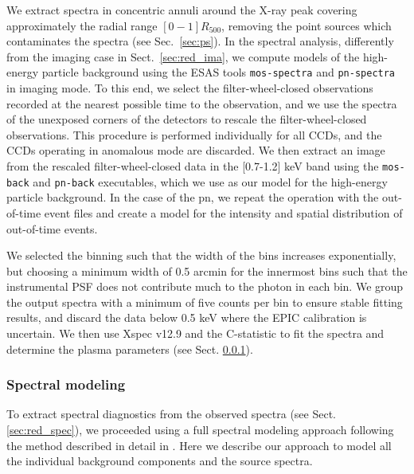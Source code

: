 \documentclass[traditabstract   ]{aa} %
\begin{document}
We extract spectra in concentric annuli around the X-ray peak covering approximately the radial range $[0-1]R_{500}${, removing the point sources which contaminates the spectra (see Sec.~\ref{sec:ps}). } 
{
In the spectral analysis, differently from the imaging case in Sect.~\ref{sec:red_ima}, we compute models of the high-energy particle background using the ESAS tools \texttt{mos-spectra} and \texttt{pn-spectra} in imaging mode. To this end, we select the filter-wheel-closed observations recorded at the nearest possible time to the observation, and we use the spectra of the unexposed corners of the detectors to rescale the filter-wheel-closed observations. This procedure is performed individually for all CCDs, and the CCDs operating in anomalous mode are discarded. We then extract an image from the rescaled filter-wheel-closed data in the [0.7-1.2] keV band using the \texttt{mos-back} and \texttt{pn-back} executables, which we use as our model for the high-energy particle background. In the case of the pn, we repeat the operation with the out-of-time event files and create a model for the intensity and spatial distribution of out-of-time events. }       

{We selected the binning such that the width of the bins increases exponentially, but choosing a minimum width of 0.5 arcmin for the innermost bins such that the instrumental PSF does not contribute much to the photon in each bin.}
We group the output spectra with a minimum of five counts per bin to ensure stable fitting results, and discard the data below 0.5 keV where the EPIC calibration is uncertain. We then use {\sc Xspec} { v12.9 and the C-statistic \citep{cash79}} to fit the spectra and determine the plasma parameters (see Sect. \ref{sec:spec}). 

\subsubsection{Spectral modeling}
\label{sec:spec}
To extract spectral diagnostics from the observed spectra (see Sect. \ref{sec:red_spec}), we proceeded using a full spectral modeling approach following the method described in detail in \citet{eckert14}. Here we describe our approach to model all the individual background components and the source spectra.
\end{document}
